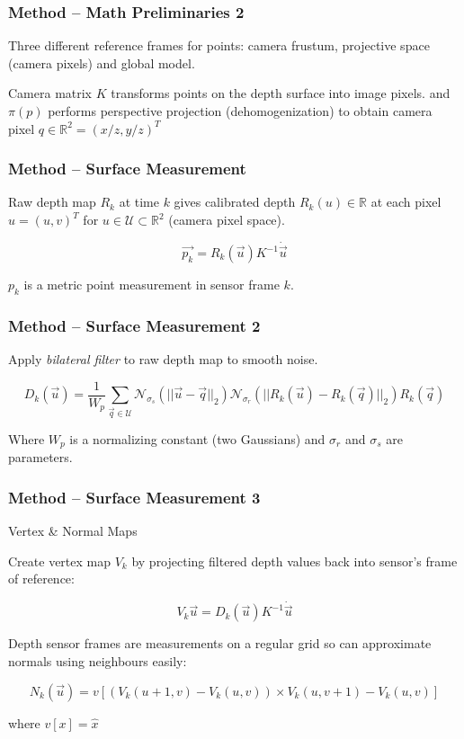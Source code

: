 \begin{frame}
\frametitle{Method -- Math Preliminaries 2}

Three different reference frames for points: camera frustum, projective space (camera pixels) and
global model.

Camera matrix $K$ transforms points on the depth surface into image pixels.
and $\pi (p)$ performs perspective projection (dehomogenization) to obtain
camera pixel $q \in \mathbb{R}^2 = (x/z, y/z)^T$

\end{frame}


\begin{frame}
\frametitle{Method -- Surface Measurement}

Raw depth map $R_k$ at time $k$ gives calibrated depth $R_k(u) \in \mathbb{R}$ at
each pixel $u = (u,v)^T$ for $u \in \mathcal{U} \subset \mathbb{R}^2$ (camera pixel space).

\[ \vec{p_k} = R_k(\vec{u})K^{-1}\dot{\vec{u}} \]

$p_k$ is a metric point measurement in sensor frame $k$.

\end{frame}

\begin{frame}
\frametitle{Method -- Surface Measurement 2}

Apply \textit{bilateral filter} to raw depth map to smooth noise.

\[ D_k(\vec{u}) = \frac{1}{W_p} \sum_{\vec{q} \in \mathcal{U}} \mathcal{N}_{\sigma_s}(||\vec{u}-\vec{q}||_2) \mathcal{N}_{\sigma_r}(||R_k(\vec{u}) - R_k(\vec{q})||_2)R_k(\vec{q}) \]

Where $W_p$ is a normalizing constant (two Gaussians) and $\sigma_r$ and $\sigma_s$ are
parameters.

\end{frame}

\begin{frame}
\frametitle{Method -- Surface Measurement 3}
{\large Vertex \& Normal Maps}

Create vertex map $V_k$ by projecting filtered depth values back into sensor's frame of reference:

\[ V_k{\vec{u}} = D_k(\vec{u})K^{-1}\dot{\vec{u}} \]

Depth sensor frames are measurements on a regular grid so can approximate normals using
neighbours easily:

\[ N_k(\vec{u}) = v\left[(V_k(u+1, v) - V_k(u,v)) \times V_k(u, v+1) - V_k(u,v)\right] \]

where $v[x] = \hat{x}$
\end{frame}

